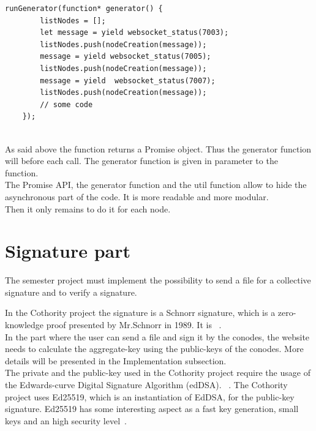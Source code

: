 \documentclass[11pt, a4paper, twoside, openright]{book} %
\begin{document}
\begin{lstlisting}[caption={Extract from the project's code reaching conodes at port 7003, 7005 and 7007}, captionpos=b]
  runGenerator(function* generator() {
        listNodes = [];
        let message = yield websocket_status(7003);
        listNodes.push(nodeCreation(message));
        message = yield websocket_status(7005);
        listNodes.push(nodeCreation(message));
        message = yield  websocket_status(7007);
        listNodes.push(nodeCreation(message));
        // some code
    });
\end{lstlisting}
\leavevmode \\
As said above the  function returns a Promise object. Thus
the generator function  will  before each  call.
The generator function is given in parameter to the  function.\\
The Promise API, the generator function and the util function  allow to hide
the asynchronous part of the code. It is more readable and more modular.\\


Then it only remains to do it for each node.

\section{Signature part}
The semester project must implement the possibility to send a file for a collective signature
and to verify a signature.


In the Cothority project the signature is a Schnorr signature, which is a zero-knowledge proof presented
by Mr.Schnorr in 1989. It is ~\cite{wikiSchnorr}.\\
In the part where the user can send a file and sign it by the conodes,
the website needs to calculate the aggregate-key using the public-keys of the conodes.
More details will be presented in the Implementation subsection.\\
The private and the public-key used in the Cothority project require the usage of
the Edwards-curve Digital Signature Algorithm (edDSA).
~\cite{edDSA}.
The Cothority project uses Ed25519, which is an instantiation of EdDSA, for the
public-key signature. Ed25519 has some interesting aspect as a fast key generation,
small keys and an high security level~\cite{ed25519}.\\
\end{document}
